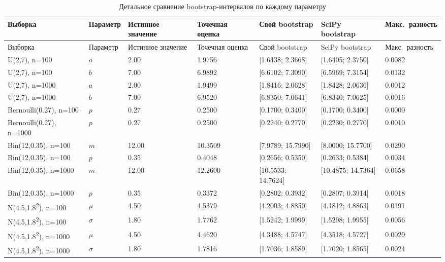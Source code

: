 \begin{longtable}{p{2.9cm} p{1.1cm} p{1.7cm} p{1.8cm} p{2.8cm} p{2.8cm} p{1.6cm}}
\caption{Детальное сравнение bootstrap-интервалов по каждому параметру}\label{tab:detail_bootstrap}\\
\toprule
Выборка & Параметр & Истинное значение & Точечная оценка & Свой bootstrap & SciPy bootstrap & Макс.\ разность \\
\midrule
\endfirsthead
\toprule
Выборка & Параметр & Истинное значение & Точечная оценка & Свой bootstrap & SciPy bootstrap & Макс.\ разность \\
\midrule
\endhead
\bottomrule
\endfoot
U(2,7), n=100 & $a$ & 2.00 & 1.9756 & [1.6438; 2.3668] & [1.6405; 2.3750] & 0.0082 \\
U(2,7), n=100 & $b$ & 7.00 & 6.9892 & [6.6102; 7.3090] & [6.5969; 7.3154] & 0.0132 \\
U(2,7), n=1000 & $a$ & 2.00 & 1.9499 & [1.8416; 2.0628] & [1.8428; 2.0636] & 0.0012 \\
U(2,7), n=1000 & $b$ & 7.00 & 6.9520 & [6.8350; 7.0641] & [6.8340; 7.0625] & 0.0016 \\
Bernoulli(0.27), n=100 & $p$ & 0.27 & 0.2500 & [0.1700; 0.3400] & [0.1700; 0.3400] & 0.0000 \\
Bernoulli(0.27), n=1000 & $p$ & 0.27 & 0.2500 & [0.2240; 0.2770] & [0.2230; 0.2770] & 0.0010 \\
Bin(12,0.35), n=100 & $m$ & 12.00 & 10.3509 & [7.9789; 15.7990] & [8.0000; 15.7700] & 0.0290 \\
Bin(12,0.35), n=100 & $p$ & 0.35 & 0.4048 & [0.2656; 0.5350] & [0.2633; 0.5384] & 0.0034 \\
Bin(12,0.35), n=1000 & $m$ & 12.00 & 12.2600 & [10.5533; 14.7624] & [10.4875; 14.7364] & 0.0658 \\
Bin(12,0.35), n=1000 & $p$ & 0.35 & 0.3372 & [0.2802; 0.3932] & [0.2807; 0.3914] & 0.0018 \\
N(4.5,1.8\textsuperscript{2}), n=100 & $\mu$ & 4.50 & 4.5379 & [4.2003; 4.8850] & [4.1812; 4.8863] & 0.0191 \\
N(4.5,1.8\textsuperscript{2}), n=100 & $\sigma$ & 1.80 & 1.7762 & [1.5242; 1.9999] & [1.5298; 1.9955] & 0.0056 \\
N(4.5,1.8\textsuperscript{2}), n=1000 & $\mu$ & 4.50 & 4.4620 & [4.3488; 4.5747] & [4.3518; 4.5727] & 0.0029 \\
N(4.5,1.8\textsuperscript{2}), n=1000 & $\sigma$ & 1.80 & 1.7816 & [1.7036; 1.8589] & [1.7020; 1.8565] & 0.0024 \\
\end{longtable}
